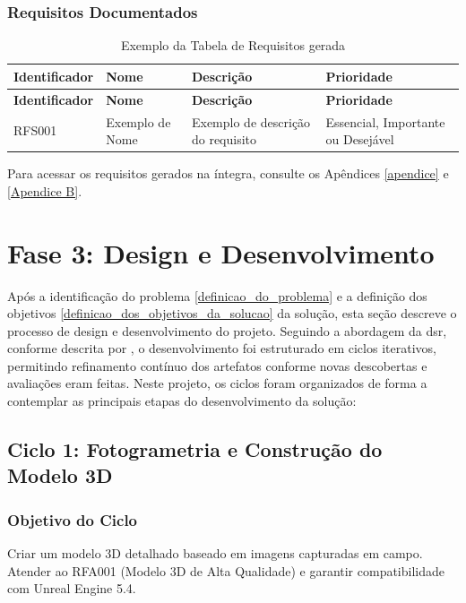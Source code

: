 \subsubsection{Requisitos Documentados}
\label{sec:requisitos_documentados}
{\small 
\begin{longtable}{|p{2.5cm}|p{4cm}|p{6cm}|p{2cm}|}
\caption{Exemplo da Tabela de Requisitos gerada}
\label{table:exemplo_tabela_requisitos} \\
\hline
\textbf{Identificador} & \textbf{Nome} & \textbf{Descrição} & \textbf{Prioridade} \\
\hline
\endfirsthead
\hline
\textbf{Identificador} & \textbf{Nome} & \textbf{Descrição} & \textbf{Prioridade} \\
\hline
\endhead
RFS001 & Exemplo de Nome & Exemplo de descrição do requisito & Essencial, Importante ou Desejável \\ \hline
\end{longtable}
}
Para acessar os requisitos gerados na íntegra, consulte os Apêndices \ref{apendice} e \ref{Apendice B}.


\section{Fase 3: Design e Desenvolvimento}\label{sec: Fase 3 design e desenvolvimento}
Após a identificação do problema \ref{definicao_do_problema} e a definição dos objetivos \ref{definicao_dos_objetivos_da_solucao} da solução, esta seção descreve o processo de design e desenvolvimento do projeto. Seguindo a abordagem da \gls{dsr}, conforme descrita por \cite{peffers2007design}, o desenvolvimento foi estruturado em ciclos iterativos, permitindo refinamento contínuo dos artefatos conforme novas descobertas e avaliações eram feitas.
Neste projeto, os ciclos foram organizados de forma a contemplar as principais etapas do desenvolvimento da solução:

\subsection*{Ciclo 1: Fotogrametria e Construção do Modelo 3D} \label{subsec:ciclo1}

\subsubsection*{Objetivo do Ciclo}
Criar um modelo 3D detalhado baseado em imagens capturadas em campo. Atender ao RFA001 (Modelo 3D de Alta Qualidade) e garantir compatibilidade com Unreal Engine 5.4. 

